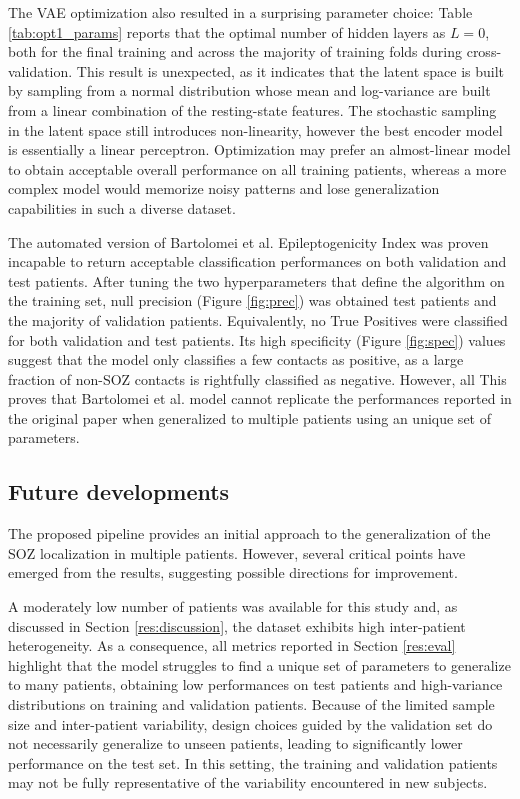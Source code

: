 The VAE optimization also resulted in a surprising parameter choice: Table
\ref{tab:opt1_params} reports that the optimal number of hidden layers as
$L=0$, both for the final training and across the majority of training folds 
during cross-validation. 
This result is unexpected, as it indicates that the latent space is built by
sampling from a normal distribution whose mean and log-variance are built
from a linear combination of the resting-state features.
The stochastic sampling in the latent space still introduces non-linearity,
however the best encoder model is essentially a linear perceptron.
Optimization may prefer an almost-linear model to obtain acceptable overall
performance on all training patients, whereas a more complex model would
memorize noisy patterns and lose generalization capabilities in such a diverse
dataset.

The automated version of Bartolomei et al. Epileptogenicity Index was proven
incapable to return acceptable classification performances on both validation 
and test patients.
After tuning the two hyperparameters that define the algorithm on the training set,
null precision (Figure \ref{fig:prec}) was obtained test patients and the majority
of validation patients.
Equivalently, no True Positives were classified for both validation and test
patients.
Its high specificity (Figure \ref{fig:spec}) values suggest that the model only
classifies a few contacts as positive, as a large fraction of non-SOZ
contacts is rightfully classified as negative.
However, all 
This proves that Bartolomei et al. model cannot replicate the performances 
reported in the original paper when generalized to multiple patients using an
unique set of parameters.


\subsection{Future developments}              \label{res:future}

The proposed pipeline provides an initial approach to the generalization of 
the SOZ localization in multiple patients.
However, several critical points have emerged from the results, suggesting
possible directions for improvement.

A moderately low number of patients was available for this study and,
as discussed in Section \ref{res:discussion}, the dataset exhibits high
inter-patient heterogeneity.
As a consequence, all metrics reported in Section \ref{res:eval} highlight that
the model struggles to find a unique set of parameters to generalize to many 
patients, obtaining low performances on test patients and high-variance 
distributions on training and validation patients.
Because of the limited sample size and inter-patient variability, design choices
guided by the validation set do not necessarily generalize to unseen patients,
leading to significantly lower performance on the test set.
In this setting, the training and validation patients may not be fully
representative of the variability encountered in new subjects.

